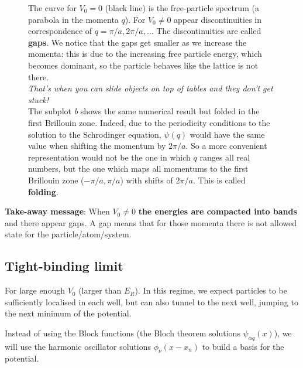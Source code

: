 \begin{figure}[H]
{The curve for $V_0 = 0$ (black line) is the free-particle spectrum (a parabola in the momenta $q$). 
For $V_0\neq 0$ appear discontinuities in correspondence of $q=\pi/a, 2\pi/a, \dots$
The discontinuities are called \textbf{gaps}. We notice that the gaps get smaller as we increase the momenta: this is due to the increasing free particle energy, which becomes dominant, so the particle behaves like the lattice is not there.\\ \textit{That's when you can slide objects on top of tables and they don't get stuck!}\\
The subplot \textit{b} shows the same numerical result but folded in the first Brillouin zone. Indeed, due to the periodicity conditions to the solution to the Schrodinger equation, $\psi(q)$ would have the same value when shifting the momentum by $2\pi/a$. So a more convenient representation would not be the one in which $q$ ranges all real numbers, but the one which maps all momentums to the first Brillouin zone ($-\pi/a, \pi/a$) with shifts of $2\pi/a$. This is called \textbf{folding}. 
}
\end{figure}


\noindent \textbf{Take-away message}: When $V_0 \neq 0$ \textbf{the energies are compacted into bands} and there appear gaps.
A gap means that for those momenta there is not allowed state for the particle/atom/system.







\subsection{Tight-binding limit}

For large enough $V_0$ (larger than $E_R$). In this regime, we expect particles to be sufficiently localised in each well, but can also tunnel to the next well, jumping to the next minimum of the potential.

Instead of using the Block functions (the Bloch theorem solutions $\psi_{\alpha q}(x)$), we will use the harmonic oscillator solutions $\phi_\nu(x - x_n)$ to build a basis for the potential.

